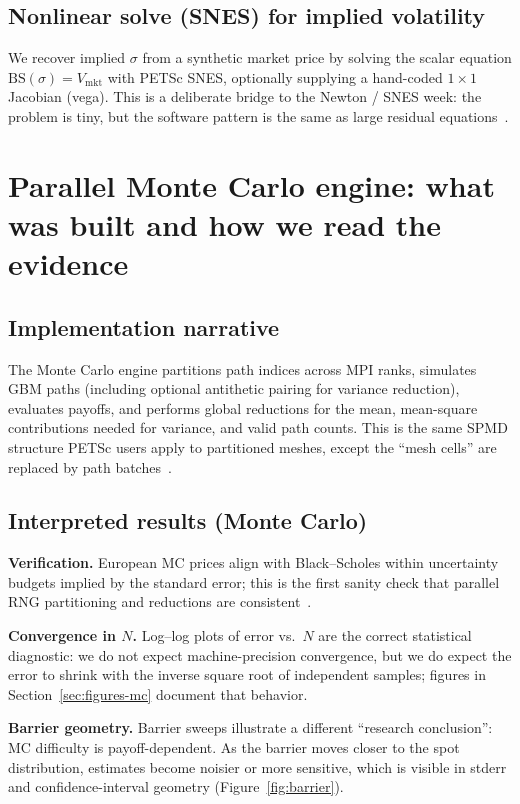 \documentclass[11pt]{article}
\begin{document}
\subsection{Nonlinear solve (SNES) for implied volatility}
We recover implied $\sigma$ from a synthetic market price by solving the scalar
equation $\mathrm{BS}(\sigma)=V_{\mathrm{mkt}}$ with PETSc \textsf{SNES},
optionally supplying a hand-coded $1\times 1$ Jacobian (vega). This is a deliberate
bridge to the Newton / SNES week: the problem is tiny, but the software pattern is
the same as large residual equations~\cite{bueler2020petsc,petsc-user-ref}.

\section{Parallel Monte Carlo engine: what was built and how we read the evidence}
\subsection{Implementation narrative}
The Monte Carlo engine partitions path indices across MPI ranks, simulates GBM paths
(including optional antithetic pairing for variance reduction), evaluates payoffs,
and performs global reductions for the mean, mean-square contributions needed for
variance, and valid path counts. This is the same SPMD structure PETSc users apply
to partitioned meshes, except the ``mesh cells'' are replaced by path
batches~\cite{petsc-efficient}.

\subsection{Interpreted results (Monte Carlo)}
\textbf{Verification.} European MC prices align with Black--Scholes within
uncertainty budgets implied by the standard error; this is the first sanity check
that parallel RNG partitioning and reductions are consistent~\cite{blackscholes}.

\textbf{Convergence in $N$.} Log--log plots of error vs.\ $N$ are the correct
statistical diagnostic: we do not expect machine-precision convergence, but we do
expect the error to shrink with the inverse square root of independent samples;
figures in Section~\ref{sec:figures-mc} document that behavior.

\textbf{Barrier geometry.} Barrier sweeps illustrate a different ``research
conclusion'': MC difficulty is payoff-dependent. As the barrier moves closer to the
spot distribution, estimates become noisier or more sensitive, which is visible in
stderr and confidence-interval geometry (Figure~\ref{fig:barrier}).
\end{document}
